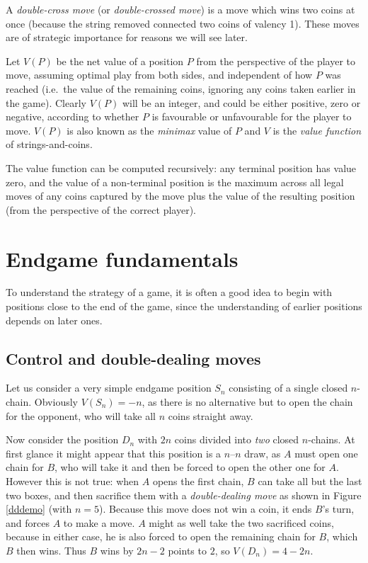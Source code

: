 \documentclass[a4paper,twocolumn]{article}
\begin{document}
A \emph{double-cross move} (or \emph{double-crossed move}) is a move
which wins two coins at once (because the string removed connected two
coins of valency 1). These moves are of strategic importance for
reasons we will see later.

Let $V(P)$ be the net value of a position $P$ from the perspective of
the player to move, assuming optimal play from both sides, and
independent of how $P$ was reached (i.e.\ the value of the remaining
coins, ignoring any coins taken earlier in the game). Clearly $V(P)$
will be an integer, and could be either positive, zero or negative,
according to whether $P$ is favourable or unfavourable for the player
to move. $V(P)$ is also known as the \emph{minimax} value of $P$ and
$V$ is the \emph{value function} of strings-and-coins.

The value function can be computed recursively: any terminal position
has value zero, and the value of a non-terminal position is the
maximum across all legal moves of any coins captured by the move plus
the value of the resulting position (from the perspective of the
correct player).

\section{Endgame fundamentals}\label{endgamesection}

To understand the strategy of a game, it is often a good idea to begin
with positions close to the end of the game, since the understanding
of earlier positions depends on later ones.

\subsection{Control and double-dealing moves}

Let us consider a very simple endgame position $S_n$ consisting of a
single closed $n$-chain. Obviously $V(S_n)=-n$, as there is no
alternative but to open the chain for the opponent, who will take all
$n$ coins straight away.

Now consider the position $D_n$ with $2n$ coins divided into
\emph{two} closed $n$-chains. At first glance it might appear that
this position is a $n$--$n$ draw, as $A$ must open one chain for $B$,
who will take it and then be forced to open the other one for
$A$. However this is not true: when $A$ opens the first chain, $B$ can
take all but the last two boxes, and then sacrifice them with a
\emph{double-dealing move} as shown in Figure \ref{dddemo} (with
$n=5$). Because this move does not win a coin, it ends $B$'s turn, and
forces $A$ to make a move. $A$ might as well take the two sacrificed
coins, because in either case, he is also forced to open the remaining
chain for $B$, which $B$ then wins. Thus $B$ wins by $2n - 2$ points
to $2$, so $V(D_n) = 4-2n$.
\end{document}
